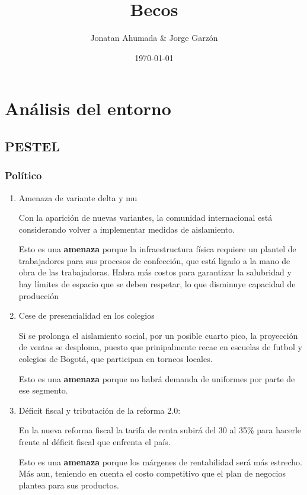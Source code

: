 \documentclass[11pt]{article}
\author{Jonatan Ahumada \& Jorge Garzón}
\date{\today}
\title{Becos}
\begin{document}
\maketitle
\tableofcontents



\section{Análisis del entorno}
\label{sec:org0a2d41b}
\subsection{PESTEL}
\label{sec:org03a0191}
\subsubsection{Político}
\label{sec:org29b85a6}
\begin{enumerate}
\item Amenaza de variante delta y mu
\label{sec:orga13095c}

Con la aparición de nuevas variantes, la comunidad internacional está
considerando volver a implementar medidas de aislamiento.

Esto es una \textbf{amenaza} porque la infraestructura física requiere un
plantel de trabajadores para sus procesos de confección, que está
ligado a la mano de obra de las trabajadoras. Habra más costos para
garantizar la salubridad y hay límites de espacio que se deben
respetar, lo que disminuye capacidad de producción

\item Cese de presencialidad en los colegios
\label{sec:org5978d9b}

Si se prolonga el aislamiento social, por un posible cuarto pico, la
proyección de ventas se desploma, puesto que prinipalmente recae en
escuelas de futbol y colegios de Bogotá, que participan en torneos
locales.

Esto es una \textbf{amenaza} porque no habrá demanda de uniformes por
parte de ese segmento.


\item Déficit fiscal y tributación de la reforma 2.0:
\label{sec:orgde015ff}

En la nueva reforma fiscal la tarifa de renta subirá del 30 al 35\%
para hacerle frente al déficit fiscal que enfrenta el país.

Esto es una \textbf{amenaza} porque los márgenes de rentabilidad será más
estrecho.  Más aun, teniendo en cuenta el costo competitivo que el
plan de negocios plantea para sus productos.
\end{enumerate}
\end{document}
